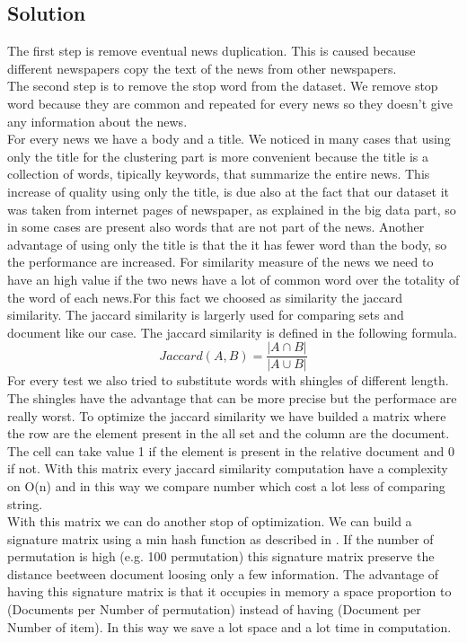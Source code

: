 \documentclass{acm_proc_article-sp}
\begin{document}
\subsection{Solution}
The first step is remove eventual news duplication. This is caused because different newspapers copy the text of the news from other newspapers.\\
The second step is to remove the stop word from the dataset. We remove stop word because they are common and repeated for every news so they doesn't give any information about the news.\\
For every news we have a body and a title. We noticed in many cases that using only the title for the clustering part is more convenient because the title is a collection of words, tipically keywords, that summarize the entire news. This increase of quality using only the title, is due also at the fact that our dataset it was taken from internet pages of newspaper, as explained in the big data part, so in some cases are present also words that are not part of the news. Another advantage of using only the title is that the it has fewer word than the body, so the performance are increased. 
For similarity measure of the news we need to have an high value if the two news have a lot of common word over the totality of the word of each news.For this fact we choosed as similarity the jaccard similarity. The jaccard similarity is largerly used for comparing sets and document like our case. The jaccard similarity is defined in the following formula.$$Jaccard(A,B) = \frac{\left\vert A \cap B \right\vert}{\left\vert A \cup B \right\vert}$$
For every test we also tried to substitute words with shingles of different length. The shingles have the advantage that can be more precise but the performace are really worst.
To optimize the jaccard similarity we have builded a matrix where the row are the element present in the all set and the column are the document. The cell can take value 1 if the element is present in the relative document and 0 if not. With this matrix every jaccard similarity computation have a complexity on O(n) and in this way we compare number which cost a lot less of comparing string. \\
With this matrix we can do another stop of optimization. We can build a signature matrix using a min hash function as described in \cite{book:MMD}. If the number of permutation is high (e.g. 100 permutation) this signature matrix preserve the distance beetween document loosing only a few information. The advantage of having this signature matrix is that it occupies in memory a space proportion to (Documents per Number of permutation) instead of having (Document per Number of item). In this way we save a lot space and a lot time in computation.
\end{document}
